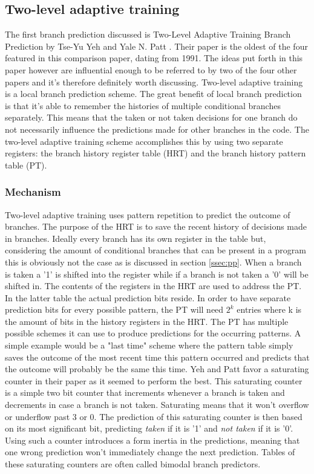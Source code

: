 \subsection{Two-level adaptive training}
\label{two-level}
The first branch prediction discussed is Two-Level Adaptive Training Branch Prediction by Tse-Yu Yeh and Yale N.
Patt \cite{twolevel}.
Their paper is the oldest of the four featured in this comparison paper, dating from 1991. The ideas put forth in this paper however are influential enough to be referred to by two of the four other papers and it's therefore definitely worth discussing.
Two-level adaptive training is a local branch prediction scheme.
The great benefit of local branch prediction is that it's able to remember the histories of multiple conditional branches separately.
This means that the taken or not taken decisions for one branch do not necessarily influence the predictions made for other branches in the code.
The two-level adaptive training scheme accomplishes this by using two separate registers: the branch history register table (HRT) and the branch history pattern table (PT).
\subsubsection{Mechanism}
Two-level adaptive training uses pattern repetition to predict the outcome of branches.
The purpose of the HRT is to save the recent history of decisions made in branches.
Ideally every branch has its own register in the table but, considering the amount of conditional branches that can be present in a program this is obviously not the case as is discussed in section \ref{ssec:pp}.
When a branch is taken a '1' is shifted into the register while if a branch is not taken a '0' will be shifted in.
The contents of the registers in the HRT are used to address the PT.
In the latter table the actual prediction bits reside.
In order to have separate prediction bits for every possible pattern, the PT will need $2^k$ entries where k is the amount of bits in the history registers in the HRT.
The PT has multiple possible schemes it can use to produce predictions for the occurring patterns.
A simple example would be a "last time" scheme where the pattern table simply saves the outcome of the most recent time this pattern occurred and predicts that the outcome will probably be the same this time.
Yeh and Patt favor a saturating counter in their paper as it seemed to perform the best.
This saturating counter is a simple two bit counter that increments whenever a branch is taken and decrements in case a branch is not taken.
Saturating means that it won't overflow or underflow past 3 or 0.
The prediction of this saturating counter is then based on its most significant bit, predicting \textit{taken} if it is '1' and \textit{not taken} if it is '0'.
Using such a counter introduces a form inertia in the predictions, meaning that one wrong prediction won't immediately change the next prediction.
Tables of these saturating counters are often called bimodal branch predictors.
